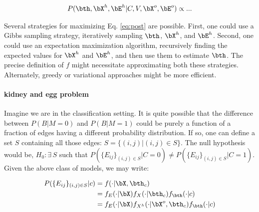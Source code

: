 \begin{align} \label{eq:post}
	P(\bth, \bX^h, \bE^h | C, V, \bX^o, \bE^o) \propto ...
\end{align}


Several strategies for maximizing Eq. \ref{eq:post} are possible.  First, one could use a Gibbs sampling strategy, iteratively sampling $\bth$, $\bX^h$, and $\bE^h$.  Second, one could use an expectation maximization algorithm, recursively finding the expected values for $\bX^h$ and $\bE^h$, and then use them to estimate $\bth$.  The precise definition of $f$ might necessitate approximating both these strategies.  Alternately, greedy or variational approaches might be more efficient.


\paragraph{kidney and egg problem}


Imagine we are in the classification setting.  It is quite possible that the difference between $P(B | M=0)$ and $P(B | M=1)$ could be purely a function of a fraction of edges having a different probability distribution.  If so, one can define a set $S$ containing all those edges: $S=\{(i,j) | (i,j) \in S\}$.  The null hypothesis would be, $H_0: \exists \, S$ such that $P(\{E_{ij}\}_{(i,j) \in S} | C=0) \neq P(\{E_{ij}\}_{(i,j) \in S} | C=1)$.  Given the above class of models, we may write:

\begin{align}
	P(\{E_{ij}\}_{(i,j) \in S} | c) &= f(\cdot | \bX, \bth_c) \nonumber \\
	&= f_E(\cdot | \bX) f_X(\cdot | \bth_c) f_{\bth}(\cdot | c) \nonumber \\
	&= f_E(\cdot | \bX) f_{X^h}(\cdot | \bX^o, \bth_c) f_{\bth}(\cdot | c)
\end{align}






